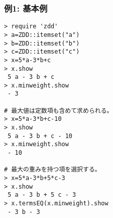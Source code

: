\subsubsection*{例1: 基本例}



\begin{Verbatim}[baselinestretch=0.7,frame=single]
> require 'zdd'
> a=ZDD::itemset("a")
> b=ZDD::itemset("b")
> c=ZDD::itemset("c")
> x=5*a-3*b+c
> x.show
 5 a - 3 b + c
> x.minweight.show
 - 3

# 最大値は定数項も含めて求められる。
> x=5*a-3*b+c-10
> x.show
 5 a - 3 b + c - 10
> x.minweight.show
 - 10

# 最大の重みを持つ項を選択する。
> x=5*a-3*b+5*c-3
> x.show
 5 a - 3 b + 5 c - 3
> x.termsEQ(x.minweight).show
 - 3 b - 3
\end{Verbatim}
